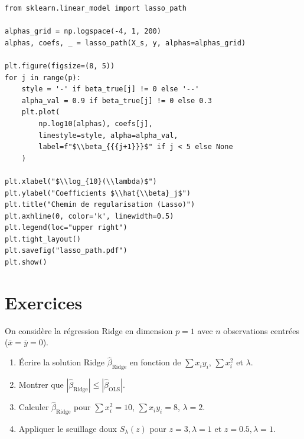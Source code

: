 \begin{codeblock}[title=\textbf{Chemin de r\'egularisation (Lasso)}]
\begin{verbatim}
from sklearn.linear_model import lasso_path

alphas_grid = np.logspace(-4, 1, 200)
alphas, coefs, _ = lasso_path(X_s, y, alphas=alphas_grid)

plt.figure(figsize=(8, 5))
for j in range(p):
    style = '-' if beta_true[j] != 0 else '--'
    alpha_val = 0.9 if beta_true[j] != 0 else 0.3
    plt.plot(
        np.log10(alphas), coefs[j],
        linestyle=style, alpha=alpha_val,
        label=f"$\\beta_{{{j+1}}}$" if j < 5 else None
    )

plt.xlabel("$\\log_{10}(\\lambda)$")
plt.ylabel("Coefficients $\\hat{\\beta}_j$")
plt.title("Chemin de regularisation (Lasso)")
plt.axhline(0, color='k', linewidth=0.5)
plt.legend(loc="upper right")
plt.tight_layout()
plt.savefig("lasso_path.pdf")
plt.show()
\end{verbatim}
\end{codeblock}

\section{Exercices}
\label{sec:regul-exercices}

\begin{exercice}
On consid\`ere la r\'egression Ridge en dimension $p = 1$ avec $n$ observations centr\'ees
($\bar{x} = \bar{y} = 0$).
\begin{enumerate}
  \item \'Ecrire la solution Ridge $\hat{\beta}_{\text{Ridge}}$ en fonction de
        $\sum x_i y_i$, $\sum x_i^2$ et $\lambda$.
  \item Montrer que $|\hat{\beta}_{\text{Ridge}}| \leq |\hat{\beta}_{\text{OLS}}|$.
  \item Calculer $\hat{\beta}_{\text{Ridge}}$ pour
        $\sum x_i^2 = 10$, $\sum x_i y_i = 8$, $\lambda = 2$.
  \item Appliquer le seuillage doux $S_\lambda(z)$ pour $z = 3, \lambda = 1$
        et $z = 0.5, \lambda = 1$.
\end{enumerate}
\end{exercice}


